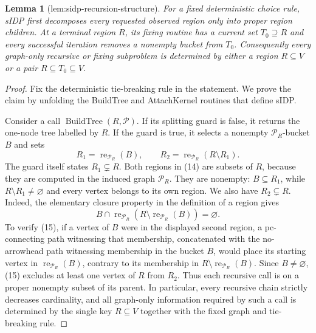 \documentclass{article}
\newtheorem{lemma}{Lemma}
\begin{document}
\begin{lemma}[lem:sidp-recursion-structure]\label{lem:sidp-recursion-structure}
For a fixed deterministic choice rule, sIDP first decomposes every requested observed region only into proper region children.  At a terminal region \(R\), its fixing routine has a current set \(T_0\supseteq R\) and every successful iteration removes a nonempty bucket from \(T_0\).  Consequently every graph-only recursive or fixing subproblem is determined by either a region \(R\subseteq V\) or a pair \(R\subseteq T_0\subseteq V\).
\end{lemma}
\begin{proof}
Fix the deterministic tie-breaking rule in the statement.  We prove the claim
by unfolding the BuildTree and AttachKernel routines that define sIDP.

Consider a call \(\operatorname{BuildTree}(R,\mathcal P)\).  If its splitting
guard is false, it returns the one-node tree labelled by \(R\).  If the guard
is true, it selects a nonempty \(\mathcal P_R\)-bucket \(B\) and sets
\[
 R_1=\operatorname{re}_{\mathcal P_R}(B),
 \qquad
 R_2=\operatorname{re}_{\mathcal P_R}(R\setminus R_1).
 \tag{14}
\]
The guard itself states \(R_1\subsetneq R\).  Both regions in (14) are subsets
of \(R\), because they are computed in the induced graph \(\mathcal P_R\).
They are nonempty: \(B\subseteq R_1\), while
\(R\setminus R_1\ne\varnothing\) and every vertex belongs to its own region.
We also have \(R_2\subsetneq R\).  Indeed, the elementary closure property in
the definition of a region gives
\[
 B\cap
 \operatorname{re}_{\mathcal P_R}
       \!\left(R\setminus\operatorname{re}_{\mathcal P_R}(B)\right)
 =\varnothing.
 \tag{15}
\]
To verify (15), if a vertex of \(B\) were in the displayed second region, a
pc-connecting path witnessing that membership, concatenated with the
no-arrowhead path witnessing membership in the bucket \(B\), would place its
starting vertex in \(\operatorname{re}_{\mathcal P_R}(B)\), contrary to its
membership in \(R\setminus\operatorname{re}_{\mathcal P_R}(B)\).  Since
\(B\ne\varnothing\), (15) excludes at least one vertex of \(R\) from \(R_2\).
Thus each recursive call is on a proper nonempty subset of its parent.  In
particular, every recursive chain strictly decreases cardinality, and all
graph-only information required by such a call is determined by the single
key \(R\subseteq V\) together with the fixed graph and tie-breaking rule.


\end{proof}
\end{document}
